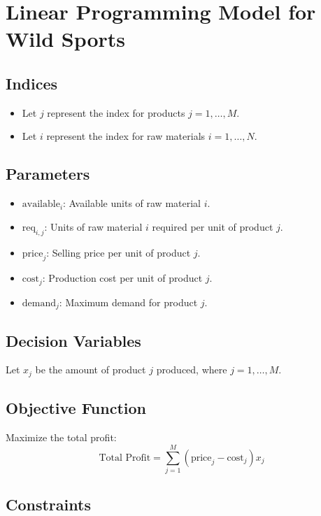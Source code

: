 \documentclass{article}
\begin{document}
\section*{Linear Programming Model for Wild Sports}

\subsection*{Indices}
\begin{itemize}
    \item Let \( j \) represent the index for products \( j = 1, \ldots, M \).
    \item Let \( i \) represent the index for raw materials \( i = 1, \ldots, N \).
\end{itemize}

\subsection*{Parameters}
\begin{itemize}
    \item \( \text{available}_i \): Available units of raw material \( i \).
    \item \( \text{req}_{i,j} \): Units of raw material \( i \) required per unit of product \( j \).
    \item \( \text{price}_j \): Selling price per unit of product \( j \).
    \item \( \text{cost}_j \): Production cost per unit of product \( j \).
    \item \( \text{demand}_j \): Maximum demand for product \( j \).
\end{itemize}

\subsection*{Decision Variables}
Let \( x_j \) be the amount of product \( j \) produced, where \( j = 1, \ldots, M \).

\subsection*{Objective Function}
Maximize the total profit:
\[
\text{Total Profit} = \sum_{j=1}^{M} ( \text{price}_j - \text{cost}_j ) x_j
\]

\subsection*{Constraints}
\end{document}
